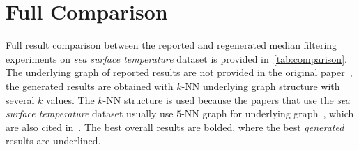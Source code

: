 \documentclass[a4paper,10pt,conference]{IEEEtran}
\begin{document}
\section{Full Comparison}
Full result comparison between the reported and regenerated median filtering experiments on \textit{sea surface temperature} dataset is provided in~\cref{tab:comparison}. The underlying graph of reported results are not provided in the original paper~\cite{median}, the generated results are obtained with \(k\)-NN underlying graph structure with several \(k\) values. The \(k\)-NN structure is used because the papers that use the \textit{sea surface temperature} dataset usually use \(5\)-NN graph for underlying graph~\cite{reconstruction,sobolev}, which are also cited in~\cite{median}. The best overall results are bolded, where the best \textit{generated} results are underlined.
\end{document}
